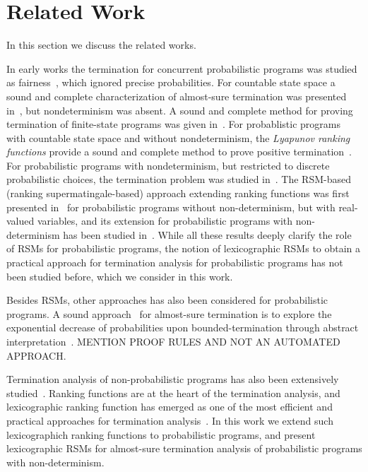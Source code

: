 
\section{Related Work}
In this section we discuss the related works.

\smallskip{}
In early works the termination for concurrent probabilistic programs was studied 
as fairness~\cite{SPH84}, which ignored precise probabilities.
For countable state space a sound and complete characterization of almost-sure termination 
was presented in~\cite{HS85}, but nondeterminism was absent.
A sound and complete method for proving termination of finite-state programs
was given in~\cite{EGK12}.
For probablistic programs with countable state space and without 
nondeterminism, the {\em Lyapunov ranking functions} provide a sound and 
complete method to prove positive termination~\cite{BG05,Foster53}.
For probabilistic programs with nondeterminism, but restricted to discrete probabilistic
choices, the termination problem was studied in~\cite{MM04,MM05}.
The RSM-based (ranking supermatingale-based) approach extending ranking functions was first 
presented in~\cite{SriramCAV} for probabilistic programs without non-determinism,
but with real-valued variables, and its extension for probabilistic programs
with non-determinism has been studied in~\cite{HolgerPOPL,CFNH16:prob-termination,CAV-POLY,POPL,ARXIV}.
While all these results deeply clarify the role of RSMs for probabilistic programs, 
the notion of lexicographic RSMs to obtain a practical approach for termination 
analysis for probabilistic programs has not been studied before, which we consider in 
this work.


\smallskip{}
Besides RSMs, other approaches has also been considered for probabilistic programs.
A sound approach~\cite{DBLP:conf/sas/Monniaux01} for almost-sure termination 
is to explore the exponential decrease of probabilities upon bounded-termination 
through abstract interpretation~\cite{DBLP:conf/popl/CousotC77}.
MENTION PROOF RULES AND NOT AN AUTOMATED APPROACH.



\smallskip{}
Termination analysis of non-probabilistic programs has also been extensively 
studied~\cite{DBLP:conf/cav/BradleyMS05,DBLP:conf/tacas/ColonS01,DBLP:conf/vmcai/PodelskiR04,DBLP:conf/pods/SohnG91,BMS05b,CSZ13,LJB01}.
Ranking functions are at the heart of the termination analysis, and lexicographic 
ranking function has emerged as one of the most efficient and practical approaches
for termination analysis~\cite{}.
In this work we extend such lexicographich ranking functions to probabilistic programs,
and present lexicographic RSMs for almost-sure termination analysis of probabilistic programs
with non-determinism.



